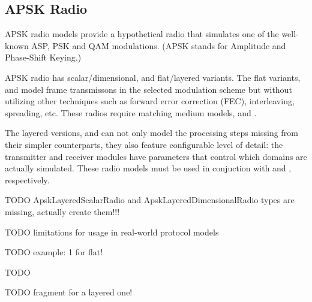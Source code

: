 \subsection{APSK Radio}

APSK radio models provide a hypothetical radio that simulates 
one of the well-known ASP, PSK and QAM modulations. 
(APSK stands for Amplitude and Phase-Shift Keying.)

APSK radio has scalar/dimensional, and flat/layered variants.
The flat variants,  and 
model frame transmissons in the selected modulation scheme
but without utilizing other techniques such as forward error 
correction (FEC), interleaving, spreading, etc. These radios
require matching medium models, 
and .

The layered versions,  
and  can not only
model the processing steps missing from their simpler counterparts,
they also feature configurable level of detail: the transmitter
and receiver modules have  parameters that 
control which domains are actually simulated.
These radio models must be used in conjuction with
 and 
, respectively.

TODO ApskLayeredScalarRadio and ApskLayeredDimensionalRadio types are missing, actually create them!!! 

TODO limitations for usage in real-world protocol models

TODO example: 1 for flat!

\begin{inifile}
TODO
\end{inifile}


TODO fragment for a layered one!

